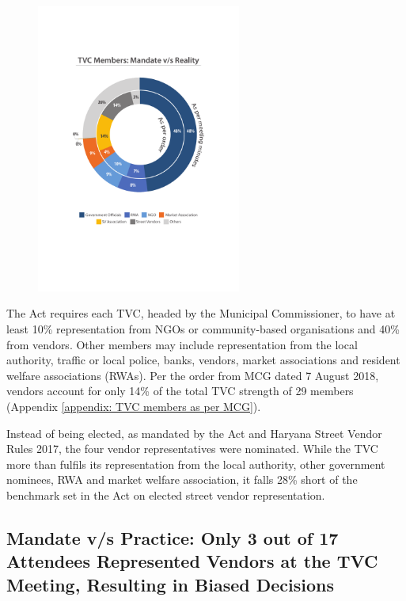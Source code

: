 \documentclass[a4paper, 12pt, twoside]{article}
\begin{document}
{\begin{figure}
\centering
\includegraphics[width=0.6\textwidth]{mandatevsreality.pdf}
\end{figure}

The Act requires each TVC, headed by the Municipal Commissioner, to have at least 10\% representation from NGOs or community-based organisations and 40\% from vendors. Other members may include representation from the local authority, traffic or local police, banks, vendors, market associations and resident welfare associations (RWAs). Per the order from MCG dated 7 August 2018, vendors account for only 14\% of the total TVC strength of 29 members (Appendix \ref{appendix: TVC members as per MCG}).

Instead of being elected, as mandated by the Act and Haryana Street Vendor Rules 2017, the four vendor representatives were nominated. While the TVC more than fulfils its representation from the local authority, other government nominees, RWA and market welfare association, it falls 28\% short of the benchmark set in the Act on elected street vendor representation.

\subsection*{Mandate v/s Practice: Only 3 out of 17 Attendees Represented Vendors at the TVC Meeting, Resulting in Biased Decisions}

}
\end{document}
